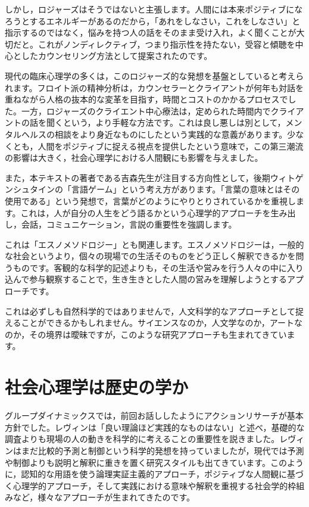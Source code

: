 \documentclass{ltjsbook}
\begin{document}
しかし，ロジャーズはそうではないと主張します。人間には本来ポジティブになろうとするエネルギーがあるのだから，「あれをしなさい，これをしなさい」と指示するのではなく，悩みを持つ人の話をそのまま受け入れ，よく聞くことが大切だと。これがノンディレクティブ，つまり指示性を持たない，受容と傾聴を中心としたカウンセリング方法として提案されたのです。

現代の臨床心理学の多くは，このロジャーズ的な発想を基盤としていると考えられます。フロイト派の精神分析は，カウンセラーとクライアントが何年も対話を重ねながら人格の抜本的な変革を目指す，時間とコストのかかるプロセスでした。一方，ロジャーズのクライエント中心療法は，定められた時間内でクライアントの話を聞くという，より手軽な方法です。これは良し悪しは別として，メンタルヘルスの相談をより身近なものにしたという実践的な意義があります。少なくとも，人間をポジティブに捉える視点を提供したという意味で，この第三潮流の影響は大きく，社会心理学における人間観にも影響を与えました。

また，本テキストの著者である吉森先生が注目する方向性として，後期ウィトゲンシュタインの「言語ゲーム」という考え方があります。「言葉の意味とはその使用である」という発想で，言葉がどのようにやりとりされているかを重視します。これは，人が自分の人生をどう語るかという心理学的アプローチを生み出し，会話，コミュニケーション，言説の重要性を強調します。

これは「エスノメソドロジー」とも関連します。エスノメソドロジーは，一般的な社会というより，個々の現場での生活そのものをどう正しく解釈できるかを問うものです。客観的な科学的記述よりも，その生活や営みを行う人々の中に入り込んで参与観察することで，生き生きとした人間の営みを理解しようとするアプローチです。

これは必ずしも自然科学的ではありませんで，人文科学的なアプローチとして捉えることができるかもしれません。サイエンスなのか，人文学なのか，アートなのか，その境界は曖昧ですが，このような研究アプローチも生まれてきています。

\section{社会心理学は歴史の学か}

グループダイナミックスでは，前回お話ししたようにアクションリサーチが基本方針でした。レヴィンは「良い理論ほど実践的なものはない」と述べ，基礎的な調査よりも現場の人の動きを科学的に考えることの重要性を説きました。レヴィンはまだ比較的予測と制御という科学的発想を持っていましたが，現代では予測や制御よりも説明と解釈に重きを置く研究スタイルも出てきています。このように，認知的な用語を使う論理実証主義的アプローチ，ポジティブな人間観に基づく心理学的アプローチ，そして実践における意味や解釈を重視する社会学的枠組みなど，様々なアプローチが生まれてきたのです。
\end{document}
